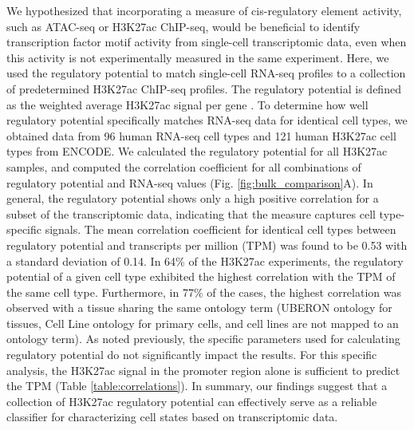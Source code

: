 We hypothesized that incorporating a measure of cis-regulatory element activity, such as ATAC-seq or H3K27ac ChIP-seq, would be beneficial to identify transcription factor motif activity from single-cell transcriptomic data, even when this activity is not experimentally measured in the same experiment. Here, we used the regulatory potential to match single-cell RNA-seq profiles to a collection of predetermined H3K27ac ChIP-seq profiles. The regulatory potential is defined as the weighted average H3K27ac signal per gene \cite{Wang2016}. To determine how well regulatory potential specifically matches RNA-seq data for identical cell types, we obtained data from 96 human RNA-seq cell types and 121 human H3K27ac cell types from ENCODE\cite{encode_dcc}. We calculated the regulatory potential for all H3K27ac samples, and computed the correlation coefficient for all combinations of regulatory potential and RNA-seq values (Fig. \ref{fig:bulk_comparison}A). In general, the regulatory potential shows only a high positive correlation for a subset of the transcriptomic data, indicating that the measure captures cell type-specific signals. The mean correlation coefficient for identical cell types between regulatory potential and transcripts per million (TPM) was found to be 0.53 with a standard deviation of 0.14. In 64\% of the H3K27ac experiments, the regulatory potential of a given cell type exhibited the highest correlation with the TPM of the same cell type. Furthermore, in 77\% of the cases, the highest correlation was observed with a tissue sharing the same ontology term (UBERON ontology for tissues, Cell Line ontology for primary cells, and cell lines are not mapped to an ontology term). As noted previously\cite{Wang2016}, the specific parameters used for calculating regulatory potential do not significantly impact the results. For this specific analysis, the H3K27ac signal in the promoter region alone is sufficient to predict the TPM (Table \ref{table:correlations}). In summary, our findings suggest that a collection of H3K27ac regulatory potential can effectively serve as a reliable classifier for characterizing cell states based on transcriptomic data.

